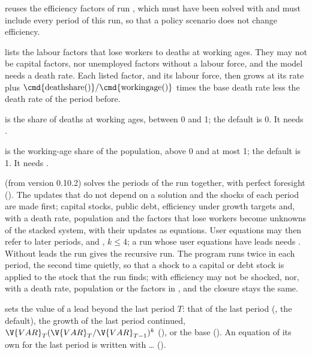 \begin{optdesc}
\item[\optarg{base}{line}{name}] reuses the efficiency factors of run
, which must have been solved with  and must
include every period of this run, so that a policy scenario does not change
efficiency.

\item[\optarg{deathf}{actors}{factors}] lists the labour factors that lose
workers to deaths at working ages. They may not be capital factors, nor
unemployed factors without a labour force, and the model needs a death rate.
Each listed factor, and its labour force, then grows at its 
rate plus $\text{\cmd{deathshare()}}/\text{\cmd{workingage()}}$ times the base
death rate less the death rate of the period before.

\item[\optarg{deaths}{hare}{\#}] is the share of deaths at working ages,
between 0 and 1; the default is 0. It needs .

\item[\optarg{work}{ingage}{\#}] is the working-age share of the population,
above 0 and at most 1; the default is 1. It needs .

\item[\opt{fores}{ight}] (from version 0.10.2) solves the periods of the run
together, with perfect foresight (). The updates that do
not depend on a solution and the shocks of each period are made first; capital
stocks, public debt, efficiency under growth targets and, with a death rate,
population and the factors that lose workers become unknowns of the stacked
system, with their updates as equations. User equations may then refer to
later periods,  and , $k \le 4$; a run
whose user equations have leads needs . Without leads the
run gives the recursive run. The  program runs twice in each
period, the second time quietly, so that a shock to a capital or debt stock
is applied to the stock that the run finds; with  efficiency
may not be shocked, nor, with a death rate, population or the factors in
, and the closure stays the same.

\item[\optarg{term}{inal}{constant|growth|base}] sets the value of a lead
beyond the last period $T$: that of the last period (, the
default), the growth of the last period continued, $\V{VAR}_T
(\V{VAR}_T/\V{VAR}_{T-1})^k$ (), or the base (). An
equation of its own for the last period is written with
 \ldots\cmd{)} ().


\end{optdesc}
